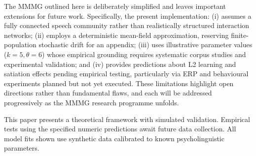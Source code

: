 \documentclass[12pt]{article}
\begin{document}



\begin{tcolorbox}[colback=lsLightBlue!30,title=Current limitations]
The MMMG outlined here is deliberately simplified and leaves important extensions for future work. Specifically, the present implementation:
(i) assumes a fully connected speech community rather than realistically structured interaction networks;  
(ii) employs a deterministic mean-field approximation, reserving finite-population stochastic drift for an appendix;  
(iii) uses illustrative parameter values (\(k=5,\theta=6\)) whose empirical grounding requires systematic corpus studies and experimental validation; and  
(iv) provides predictions about L2 learning and satiation effects pending empirical testing, particularly via ERP and behavioural experiments planned but not yet executed.
These limitations highlight open directions rather than fundamental flaws, and each will be addressed progressively as the MMMG research programme unfolds.
\end{tcolorbox}

\begin{tcolorbox}[colback=lsLightBlue!30,title=Scope and limitations]
This paper presents a theoretical framework with simulated validation. 
Empirical tests using the specified numeric predictions await future 
data collection. All model fits shown use synthetic data calibrated 
to known psycholinguistic parameters.
\end{tcolorbox}
\end{document}
